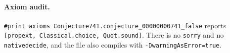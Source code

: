 \documentclass[11pt]{article}
\theoremstyle{definition}
\theoremstyle{remark}
\renewcommand{\_}{\oldus\allowbreak}
\begin{document}
\paragraph{Axiom audit.} \verb|#print axioms Conjecture741.conjecture_00000000741_false| reports
\texttt{[propext, Classical.choice, Quot.sound]}. There is no \texttt{sorry} and no
\texttt{native\_decide}, and the file also compiles with \texttt{-DwarningAsError=true}.
\end{document}
